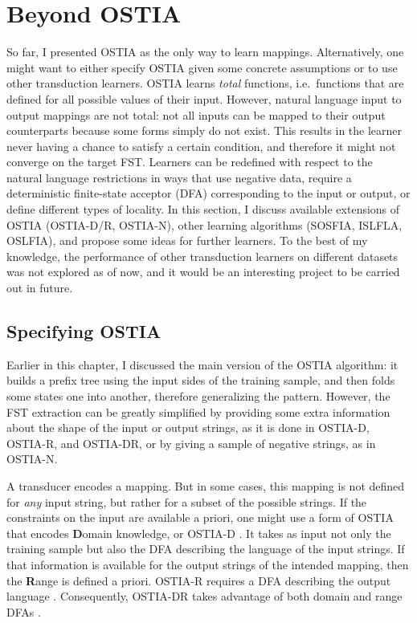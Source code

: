 \section{Beyond OSTIA}

So far, I presented OSTIA as the only way to learn mappings.
Alternatively, one might want to either specify OSTIA given some concrete assumptions or to use other transduction learners.
OSTIA learns \emph{total} functions, i.e.\ functions that are defined for all possible values of their input.
However, natural language input to output mappings are not total: not all inputs can be mapped to their output counterparts because some forms simply do not exist.
This results in the learner never having a chance to satisfy a certain condition, and therefore it might not converge on the target FST.
Learners can be redefined with respect to the natural language restrictions in ways that use negative data, require a deterministic finite-state acceptor (DFA) corresponding to the input or output, or define different types of locality.
In this section, I discuss available extensions of OSTIA (OSTIA-D/R, OSTIA-N), other learning algorithms (SOSFIA, ISLFLA, OSLFIA), and propose some ideas for further learners.
To the best of my knowledge, the performance of other transduction learners on different datasets was not explored as of now, and it would be an interesting project to be carried out in future.



\subsection{Specifying OSTIA}

Earlier in this chapter, I discussed the main version of the OSTIA algorithm: it builds a prefix tree using the input sides of the training sample, and then folds some states one into another, therefore generalizing the pattern.
However, the FST extraction can be greatly simplified by providing some extra information about the shape of the input or output strings, as it is done in OSTIA-D, OSTIA-R, and OSTIA-DR, or by giving a sample of negative strings, as in OSTIA-N.

A transducer encodes a mapping.
But in some cases, this mapping is not defined for \emph{any} input string, but rather for a subset of the possible strings.
If the constraints on the input are available a priori, one might use a form of OSTIA that encodes \textbf{D}omain knowledge, or OSTIA-D \citep{OncinaVaro1996}.
It takes as input not only the training sample but also the DFA describing the language of the input strings.
If that information is available for the output strings of the intended mapping, then the \textbf{R}ange is defined a priori.
OSTIA-R requires a DFA describing the output language \citep{CastellanosEtAl1998}.
Consequently, OSTIA-DR takes advantage of both domain and range DFAs \citep{OncinaVaro1996}.

